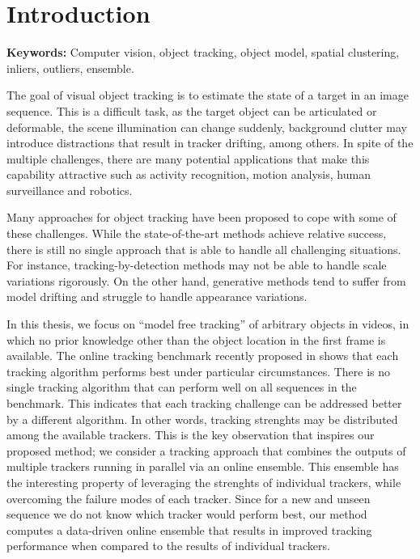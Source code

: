 
\chapter{Introduction} %

\label{chapter::introduction} 


\textbf{Keywords: }Computer vision, object tracking, object model, spatial
clustering, inliers, outliers, ensemble.

The goal of visual object tracking is to estimate the state of a target in an
image sequence.
This is a difficult task, as the target object can be articulated or
deformable, the scene illumination can change suddenly, background
clutter may introduce distractions that result in tracker drifting,
among others. In spite of the multiple challenges, there are many potential
applications that make this capability attractive such as
activity recognition, motion analysis, human surveillance and robotics.

Many approaches for object tracking have been proposed to cope with some of
these challenges.
While the state-of-the-art methods achieve relative success,
there is still no single approach that is able to handle all challenging
situations.
For instance, tracking-by-detection methods may not be able to handle scale
variations rigorously.
On the other hand, generative methods tend to suffer from model drifting and
struggle to handle appearance variations.

In this thesis, we focus on ``model free tracking'' of
arbitrary objects in videos, in which no prior knowledge other than
the object location in the first frame is available.
The online tracking benchmark recently proposed in \cite{Wu2013B}
shows that
each tracking algorithm performs best under particular circumstances.
There is no single tracking algorithm that can perform well on all
sequences in the benchmark. This indicates that each tracking challenge
can be addressed better by a different algorithm. In other words,
tracking strenghts may be distributed among the available trackers.
This is the key observation that inspires our proposed method;
we consider a tracking approach that combines the outputs
of multiple trackers running in parallel via an online ensemble.
This ensemble has the interesting property of leveraging the strenghts
of individual trackers, while overcoming the failure modes of
each  tracker. Since for a new and unseen sequence we do
not know which tracker would perform best, our method computes
a data-driven online ensemble that results in improved tracking performance
when compared to the results of individual trackers.

